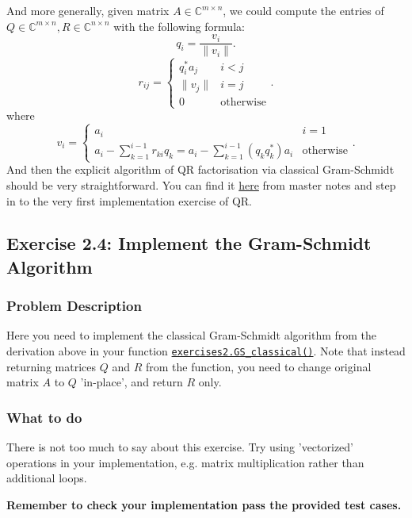 \noindent And more generally, given matrix \(A \in \mathbb{C}^{m \times n}\), we could compute the entries of \(Q \in \mathbb{C}^{m \times  n}, R \in \mathbb{C}^{n \times  n}\) with the following formula:
\[
  q_i = \frac{v_{i}}{\|v_{i}\|}
.\]
\[
  r_{ij} = \left\{
    \begin{array}{ll}
    q_{i}^{*}a_{j} & i < j\\
    \|v_{j}\| & i = j\\
    0 & \text{otherwise}
    \end{array}
  \right.
.\]
where
\[
  v_{i} = \left\{
      \begin{array}{ll}
      a_{i} & i = 1\\
      a_{i} - \sum_{k=1}^{i - 1} r_{ki}q_{k} = a_{i} - \sum_{k=1}^{i - 1} (q_{k}q_{k}^{*})a_{i} & \text{otherwise}
      \end{array}
  \right.
.\]
And then the explicit algorithm of QR factorisation via classical Gram-Schmidt should be very straightforward. You can find it \href{https://comp-lin-alg.github.io/L2_QR_factorisation.html#qr-factorisation-by-classical-gram-schmidt-algorithm}{here} from master notes and step in to the very first implementation exercise of QR.

\subsection*{Exercise 2.4: Implement the Gram-Schmidt Algorithm}
\subsubsection*{Problem Description}%
Here you need to implement the classical Gram-Schmidt algorithm from the derivation above in your function \href{https://comp-lin-alg.github.io/cla_utils.html#cla_utils.exercises2.GS_classical}{\texttt{exercises2.GS\_classical()}}. Note that instead returning matrices \(Q\) and \(R\) from the function, you need to change original matrix \(A\) to \(Q\) 'in-place', and return \(R\) only.
\subsubsection*{What to do}
There is not too much to say about this exercise. Try using 'vectorized' operations in your implementation, e.g. matrix multiplication rather than additional loops. \medskip

\noindent \textbf{Remember to check your implementation pass the provided test cases.}